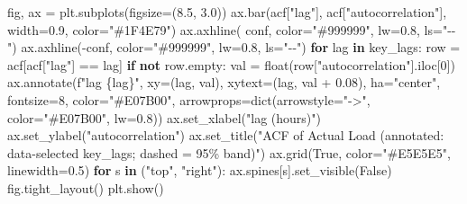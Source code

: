\documentclass[
  english,
  letterpaper,
]{scrbook}
\newenvironment{Shaded}{\begin{snugshade}}{\end{snugshade}}
\newcommand{\BuiltInTok}[1]{\textcolor[rgb]{0.00,0.23,0.31}{#1}}
\newcommand{\ControlFlowTok}[1]{\textcolor[rgb]{0.00,0.23,0.31}{\textbf{#1}}}
\newcommand{\DecValTok}[1]{\textcolor[rgb]{0.68,0.00,0.00}{#1}}
\newcommand{\FloatTok}[1]{\textcolor[rgb]{0.68,0.00,0.00}{#1}}
\newcommand{\KeywordTok}[1]{\textcolor[rgb]{0.00,0.23,0.31}{\textbf{#1}}}
\newcommand{\NormalTok}[1]{\textcolor[rgb]{0.00,0.23,0.31}{#1}}
\newcommand{\OperatorTok}[1]{\textcolor[rgb]{0.37,0.37,0.37}{#1}}
\newcommand{\SpecialCharTok}[1]{\textcolor[rgb]{0.37,0.37,0.37}{#1}}
\newcommand{\SpecialStringTok}[1]{\textcolor[rgb]{0.13,0.47,0.30}{#1}}
\newcommand{\StringTok}[1]{\textcolor[rgb]{0.13,0.47,0.30}{#1}}
\newcommand{\VariableTok}[1]{\textcolor[rgb]{0.07,0.07,0.07}{#1}}
\begin{document}
\begin{Shaded}
\begin{Highlighting}[]
\NormalTok{fig, ax }\OperatorTok{=}\NormalTok{ plt.subplots(figsize}\OperatorTok{=}\NormalTok{(}\FloatTok{8.5}\NormalTok{, }\FloatTok{3.0}\NormalTok{))}
\NormalTok{ax.bar(acf[}\StringTok{"lag"}\NormalTok{], acf[}\StringTok{"autocorrelation"}\NormalTok{], width}\OperatorTok{=}\FloatTok{0.9}\NormalTok{, color}\OperatorTok{=}\StringTok{"\#1F4E79"}\NormalTok{)}
\NormalTok{ax.axhline( conf, color}\OperatorTok{=}\StringTok{"\#999999"}\NormalTok{, lw}\OperatorTok{=}\FloatTok{0.8}\NormalTok{, ls}\OperatorTok{=}\StringTok{"{-}{-}"}\NormalTok{)}
\NormalTok{ax.axhline(}\OperatorTok{{-}}\NormalTok{conf, color}\OperatorTok{=}\StringTok{"\#999999"}\NormalTok{, lw}\OperatorTok{=}\FloatTok{0.8}\NormalTok{, ls}\OperatorTok{=}\StringTok{"{-}{-}"}\NormalTok{)}
\ControlFlowTok{for}\NormalTok{ lag }\KeywordTok{in}\NormalTok{ key\_lags:}
\NormalTok{    row }\OperatorTok{=}\NormalTok{ acf[acf[}\StringTok{"lag"}\NormalTok{] }\OperatorTok{==}\NormalTok{ lag]}
    \ControlFlowTok{if} \KeywordTok{not}\NormalTok{ row.empty:}
\NormalTok{        val }\OperatorTok{=} \BuiltInTok{float}\NormalTok{(row[}\StringTok{"autocorrelation"}\NormalTok{].iloc[}\DecValTok{0}\NormalTok{])}
\NormalTok{        ax.annotate(}\SpecialStringTok{f"lag }\SpecialCharTok{\{}\NormalTok{lag}\SpecialCharTok{\}}\SpecialStringTok{"}\NormalTok{, xy}\OperatorTok{=}\NormalTok{(lag, val),}
\NormalTok{                    xytext}\OperatorTok{=}\NormalTok{(lag, val }\OperatorTok{+} \FloatTok{0.08}\NormalTok{), ha}\OperatorTok{=}\StringTok{"center"}\NormalTok{, fontsize}\OperatorTok{=}\DecValTok{8}\NormalTok{,}
\NormalTok{                    color}\OperatorTok{=}\StringTok{"\#E07B00"}\NormalTok{,}
\NormalTok{                    arrowprops}\OperatorTok{=}\BuiltInTok{dict}\NormalTok{(arrowstyle}\OperatorTok{=}\StringTok{"{-}\textgreater{}"}\NormalTok{, color}\OperatorTok{=}\StringTok{"\#E07B00"}\NormalTok{, lw}\OperatorTok{=}\FloatTok{0.8}\NormalTok{))}
\NormalTok{ax.set\_xlabel(}\StringTok{"lag (hours)"}\NormalTok{)}
\NormalTok{ax.set\_ylabel(}\StringTok{"autocorrelation"}\NormalTok{)}
\NormalTok{ax.set\_title(}\StringTok{"ACF of Actual Load (annotated: data{-}selected key\_lags; dashed = 95\% band)"}\NormalTok{)}
\NormalTok{ax.grid(}\VariableTok{True}\NormalTok{, color}\OperatorTok{=}\StringTok{"\#E5E5E5"}\NormalTok{, linewidth}\OperatorTok{=}\FloatTok{0.5}\NormalTok{)}
\ControlFlowTok{for}\NormalTok{ s }\KeywordTok{in}\NormalTok{ (}\StringTok{"top"}\NormalTok{, }\StringTok{"right"}\NormalTok{):}
\NormalTok{    ax.spines[s].set\_visible(}\VariableTok{False}\NormalTok{)}
\NormalTok{fig.tight\_layout()}
\NormalTok{plt.show()}
\end{Highlighting}
\end{Shaded}
\end{document}
